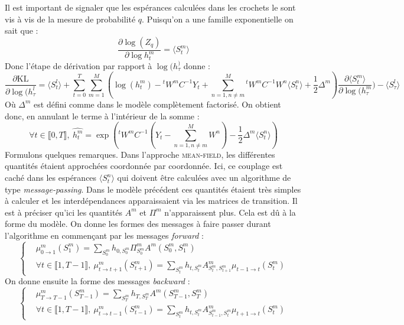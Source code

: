 \documentclass[10pt,a4paper]{article}
\newcommand{\meanfield}{\textsc{mean-field}}
\begin{document}
Il est important de signaler que les espérances calculées dans les crochets le 
sont vis à vis de la mesure de probabilité $q$.
Puisqu'on a une famille exponentielle on sait que :
\begin{equation}
\frac{\partial \log(Z_q)}{\partial \log h_t^m} = \langle S_t^m \rangle
\end{equation}
Donc l'étape de dérivation par rapport à $\log(h_{\tau}^)$ donne :
\begin{equation}
\frac{\partial \text{KL}}{\partial \log(h_{\tau}^l} = \langle S_t^l \rangle + 
\underset{t=0}{\overset{T}{\sum}} \underset{m=1}{\overset{M}{\sum}} \left( 
\log(h_t^m) -{}^t W^mC^{-1}Y_t + \underset{n=1, n \neq 
m}{\overset{M}{\sum}}{}^t W^m C^{-1} W^n \langle S_t^n \rangle + 
\frac{1}{2}\Delta^m \right) \frac{\partial \langle S_t^m \rangle}{\partial 
\log(h_{\tau}^m})-\langle S_{\tau}^l \rangle
\end{equation}
Où $\Delta^m$ est défini comme dans le modèle complètement factorisé. On 
obtient donc, en annulant le terme à l'intérieur de la somme :
\begin{equation}
\forall t \in \llbracket 0,T \rrbracket, \ \hat{h_t^m} = \exp \left( 
{}^tW^mC^{-1} \left( Y_t - \underset{n=1, n \neq m}{\overset{M}{\sum}} W^n 
\right) -\frac{1}{2} \Delta^m \langle S_t^n \rangle \right)
\end{equation}
Formulons quelques remarques. Dans l'approche \meanfield, les différentes 
quantités étaient approchées coordonnée par coordonnée. Ici, ce couplage est 
caché dans les espérances $\langle S_t^n \rangle$ qui doivent être calculées 
avec un algorithme de type \textit{message-passing}. Dans le modèle précédent 
ces quantités étaient très simples à calculer et les interdépendances 
apparaissaient via les matrices de transition. Il est à préciser qu'ici les 
quantités $A^m$ et $\Pi^m$ n'apparaissent plus. Cela est dû à la forme du 
modèle. On donne les formes des messages à faire passer durant l'algorithme en 
commençant par les messages \textit{forward} :
\begin{equation}
\left \lbrace
\begin{aligned}
& \mu_{0 \rightarrow 1}^m(S_1^m) = \underset{S_0^m}{\sum} h_{0,S_0^m} 
\Pi^m_{S_0^m} A^m(S_0^m, S_1^m) \\
&\forall t \in \llbracket 1,T-1 \rrbracket, \ \mu_{t \rightarrow 
t+1}^m(S_{t+1}^m)=\underset{S_t^m}{\sum} h_{t,S_t^m} A_{S_t^m,S_{t+1}^m}^m 
\mu_{t-1 \rightarrow t}(S_t^m)
\end{aligned}
\right.
\end{equation}
On donne ensuite la forme des messages \textit{backward} : 
\begin{equation}
\left \lbrace
\begin{aligned}
& \mu_{T \rightarrow T-1}^m(S_{T-1}^m) = \underset{S_T^m}{\sum} h_{T,S_T^m} 
A^m(S_{T-1}^m, S_T^m) \\
&\forall t \in \llbracket 1,T-1 \rrbracket, \ \mu_{t \rightarrow 
t-1}^m(S_{t-1}^m)=\underset{S_t^m}{\sum} h_{t,S_t^m} A_{S_{t-1}^m,S_{t}^m}^m 
\mu_{t+1 \rightarrow t}(S_t^m)
\end{aligned}
\right.
\end{equation}
\end{document}
